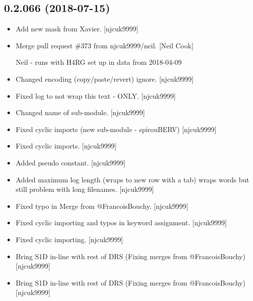 \documentclass[a4paper,10pt,english]{report}
\begin{document}
\subsection{0.2.066 (2018-07-15)}
\label{\detokenize{misc/changelog:id392}}\begin{itemize}
\item {} 
Add new mask from Xavier. {[}njcuk9999{]}

\item {} 
Merge pull request \#373 from njcuk9999/neil. {[}Neil Cook{]}

Neil - runs with H4RG set up in data from 2018-04-09

\item {} 
Changed encoding (copy/paste/revert) \textendash{} ignore. {[}njcuk9999{]}

\item {} 
Fixed log to not wrap this text - ONLY. {[}njcuk9999{]}

\item {} 
Changed name of sub-module. {[}njcuk9999{]}

\item {} 
Fixed cyclic imports (new sub-module - spirouBERV) {[}njcuk9999{]}

\item {} 
Fixed cyclic imports. {[}njcuk9999{]}

\item {} 
Added  pseudo constant. {[}njcuk9999{]}

\item {} 
Added maximum log length (wraps to new row with a tab) wraps words but
still problem with long filenames. {[}njcuk9999{]}

\item {} 
Fixed typo in Merge from @FrancoisBouchy. {[}njcuk9999{]}

\item {} 
Fixed cyclic importing and typos in keyword assignment. {[}njcuk9999{]}

\item {} 
Fixed cyclic importing. {[}njcuk9999{]}

\item {} 
Bring S1D  in-line with rest of DRS (Fixing merges from
@FrancoisBouchy) {[}njcuk9999{]}

\item {} 
Bring S1D  in-line with rest of DRS (Fixing merges from
@FrancoisBouchy) {[}njcuk9999{]}


\end{itemize}
\end{document}
